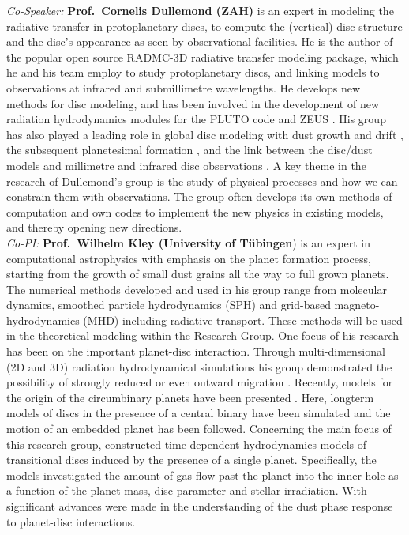 \documentclass[10pt,fleqn,twoside]{article}
\begin{document}
{\it Co-Speaker:} {\bf Prof.\ Cornelis Dullemond (ZAH)} is an expert in modeling the radiative transfer in protoplanetary
discs, to compute the (vertical) disc structure and the disc's appearance as seen
by observational facilities. He is the author of the popular open source RADMC-3D 
radiative transfer modeling package, which he and his team employ to study
protoplanetary discs, and linking models to observations at infrared and submillimetre
wavelengths. He develops new methods for disc modeling, and has been involved
in the development of new radiation hydrodynamics modules for the PLUTO code
\citep{2010A&A...511A..81K} and ZEUS \citep{2015A&A...574A..81R}. His group has also played a
leading role in global disc modeling with dust growth and drift 
\citep[e.g.,][]{2008A&A...480..859B, 2008A&A...489..931Z, 2010A&A...513A..56G,
2010A&A...513A..57Z, 2009A&A...503L...5B, 2010A&A...513A..79B}, 
the subsequent planetesimal formation 
\citep[e.g.,][]{2010Icar..210..507O, 2012A&A...544L..16W, 2014A&A...572A..78D}, 
and the link between the disc/dust models and millimetre
and infrared disc observations 
\citep[e.g.,][]{2012A&A...538A.114P, 2013Sci...340.1199V,
2016ApJ...820...54K, 2016ApJ...831L..12K}. 
A key theme in the research of Dullemond's group is the study 
of physical processes and how we can constrain them with observations. The
group often develops its own methods of computation and own codes to implement
the new physics in existing models, and thereby opening new
directions. \\

{\it Co-PI:} {\bf Prof.\ Wilhelm Kley (University of T\"ubingen}) is an expert in computational astrophysics with emphasis on the
planet formation process, starting from the growth of small dust grains all the way
to full grown planets. The numerical methods developed and used in his group range 
from molecular dynamics, smoothed particle hydrodynamics (SPH) and grid-based 
magneto-hydrodynamics (MHD) including radiative transport. These methods will be used
in the theoretical modeling within the Research Group.   
One focus of his research has been on the important planet-disc
interaction. Through multi-dimensional (2D and 3D) radiation hydrodynamical simulations
his group demonstrated the possibility of strongly reduced or even outward migration
\citep{2008A&A...487L...9K, 2009A&A...506..971K}. Recently, models for the origin of the
circumbinary planets have been presented \citep{2014A&A...564A..72K}. Here, longterm models of
discs in the presence of a central binary have been simulated and the motion of an embedded
planet has been followed. Concerning the main focus of this research group, 
\citet{2013A&A...560A..40M} constructed time-dependent hydrodynamics models of transitional discs induced by the
presence of a single planet. Specifically, the models investigated the amount of gas flow past
the planet into the inner hole as a function of the planet mass, disc
parameter and stellar irradiation. With \citet{2015A&A...584A.110P}
significant advances were made in the understanding of the dust phase
response to planet-disc interactions. \\
\end{document}
